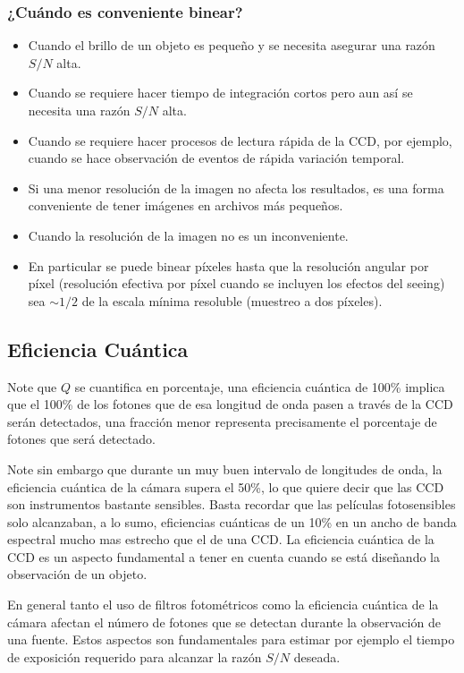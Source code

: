\documentclass{article}
\begin{document}
\subsubsection{¿Cuándo es conveniente binear?}
\begin{itemize}
    \item Cuando el brillo de un objeto es pequeño y se necesita asegurar una razón $S/N$ alta.
    \item Cuando se requiere hacer tiempo de integración cortos pero aun así se necesita una razón $S/N$ alta.
    \item Cuando se requiere hacer procesos de lectura rápida de la CCD, por ejemplo, cuando se hace observación de eventos de rápida variación temporal.
    \item Si una menor resolución de la imagen no afecta los resultados, es una forma conveniente de tener imágenes en archivos más pequeños.
    \item Cuando la resolución de la imagen no es un inconveniente.
    \item En particular se puede binear píxeles hasta que la resolución angular por píxel (resolución efectiva por píxel cuando se incluyen los efectos del seeing) sea $\sim 1/2$ de la escala mínima resoluble (muestreo a dos píxeles).
\end{itemize}

\subsection{Eficiencia Cuántica}


Note que $Q$ se cuantifica en porcentaje, una eficiencia cuántica de 100\% implica que el 100\% de los fotones que de esa longitud de onda pasen a través de la CCD serán detectados, una fracción menor representa precisamente el porcentaje de fotones que será detectado.

Note sin embargo que durante un muy buen intervalo de longitudes de onda, la eficiencia cuántica de la cámara supera el 50\%, lo que quiere decir que las CCD son instrumentos bastante sensibles. Basta recordar que las películas fotosensibles solo alcanzaban, a lo sumo, eficiencias cuánticas de un 10\% en un ancho de banda espectral mucho mas estrecho que el de una CCD. La eficiencia cuántica de la CCD es un aspecto fundamental a tener en cuenta cuando se está diseñando la observación de un objeto.

En general tanto el uso de filtros fotométricos como la eficiencia cuántica de la cámara afectan el número de fotones que se detectan durante la observación de una fuente. Estos aspectos son fundamentales para estimar por ejemplo el tiempo de exposición requerido para alcanzar la razón $S/N$ deseada.
\end{document}

